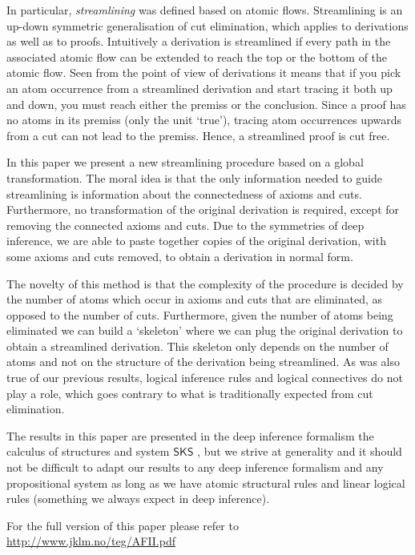 \documentclass[a4paper]{llncs}
\begin{document}
In particular, \emph{streamlining} was defined based on atomic flows. Streamlining is an up-down symmetric generalisation of cut elimination, which applies to derivations as well as to proofs. Intuitively a derivation is streamlined if every path in the associated atomic flow can be extended to reach the top or the bottom of the atomic flow. Seen from the point of view of derivations it means that if you pick an atom occurrence from a streamlined derivation and start tracing it both up and down, you must reach either the premiss or the conclusion. Since a proof has no atoms in its premiss (only the unit `true'), tracing atom occurrences upwards from a cut can not lead to the premiss. Hence,  a streamlined proof is cut free.

In this paper we present a new streamlining procedure based on a global transformation. The moral idea is that the only information needed to guide streamlining is information about the connectedness of axioms and cuts. Furthermore, no transformation of the original derivation is required, except for removing the connected axioms and cuts. Due to the symmetries of deep inference, we are able to paste together copies of the original derivation, with some axioms and cuts removed, to obtain a derivation in normal form.

The novelty of this method is that the complexity of the procedure is decided by the number of atoms which occur in axioms and cuts that are eliminated, as opposed to the number of cuts. Furthermore, given the number of atoms being eliminated we can build a `skeleton' where we can plug the original derivation to obtain a streamlined derivation. This skeleton only depends on the number of atoms and not on the structure of the derivation being streamlined. As was also true of our previous results, logical inference rules and logical connectives do not play a role, which goes contrary to what is traditionally expected from cut elimination.

\newcommand{\SKS}{\mathsf{SKS}}
The results in this paper are presented in the deep inference formalism the calculus of structures \cite{Gugl:06:A-System:kl} and system $\SKS$ \cite{BrunTiu:01:A-Local-:mz}, but we strive at generality and it should not be difficult to adapt our results to any deep inference formalism and any propositional system as long as we have atomic structural rules and linear logical rules (something we always expect in deep inference).

For the full version of this paper please refer to \url{http://www.jklm.no/teg/AFII.pdf}




\end{document}
